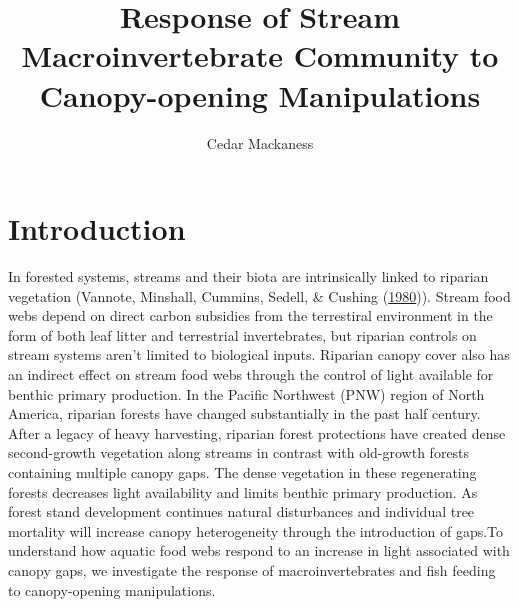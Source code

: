 \documentclass[double,12pt]{beavtex}
\title{Response of Stream Macroinvertebrate Community to Canopy-opening
Manipulations} %
\author{Cedar Mackaness} %
\begin{document}
\maketitle
\mainmatter


  \chapter*{Introduction}\label{introduction}
  
  In forested systems, streams and their biota are intrinsically linked to
  riparian vegetation (Vannote, Minshall, Cummins, Sedell, \& Cushing
  (\protect\hyperlink{ref-Vannote1980}{1980})). Stream food webs depend on
  direct carbon subsidies from the terrestiral environment in the form of
  both leaf litter and terrestrial invertebrates, but riparian controls on
  stream systems aren't limited to biological inputs. Riparian canopy
  cover also has an indirect effect on stream food webs through the
  control of light available for benthic primary production. In the
  Pacific Northwest (PNW) region of North America, riparian forests have
  changed substantially in the past half century. After a legacy of heavy
  harvesting, riparian forest protections have created dense second-growth
  vegetation along streams in contrast with old-growth forests containing
  multiple canopy gaps. The dense vegetation in these regenerating forests
  decreases light availability and limits benthic primary production. As
  forest stand development continues natural disturbances and individual
  tree mortality will increase canopy heterogeneity through the
  introduction of gaps.To understand how aquatic food webs respond to an
  increase in light associated with canopy gaps, we investigate the
  response of macroinvertebrates and fish feeding to canopy-opening
  manipulations.
  
\end{document}
